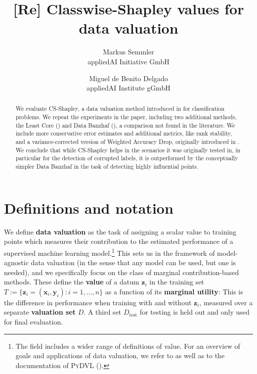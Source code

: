 \documentclass[10pt]{article}
\newcommand{\assign}{:=}
\newcommand{\tmaffiliation}[1]{\\ #1}
\newcommand{\tmdfn}[1]{\textbf{#1}}
\newcommand{\tmmathbf}[1]{\ensuremath{\boldsymbol{#1}}}
\newcommand{\tmname}[1]{\textsc{#1}}
\newcommand{\tmop}[1]{\ensuremath{\operatorname{#1}}}
\begin{document}
\title{[Re] Classwise-Shapley values for data valuation}

\author{
  Markus Semmler
  \tmaffiliation{appliedAI Initiative GmbH}
  \and
  Miguel de Benito Delgado
  \tmaffiliation{appliedAI Institute gGmbH}
}

\maketitle

\begin{abstract}
  We evaluate CS-Shapley, a data valuation method introduced in
  {\cite{schoch_csshapley_2022}} for classification problems. We repeat the
  experiments in the paper, including two additional methods, the Least Core
  ({\cite{yan_if_2021}}) and Data Banzhaf ({\cite{wang_data_2022}}), a
  comparison not found in the literature. We include more conservative error
  estimates and additional metrics, like rank stability, and a
  variance-corrected version of Weighted Accuracy Drop, originally introduced
  in {\cite{schoch_csshapley_2022}}. We conclude that while CS-Shapley helps
  in the scenarios it was originally tested in, in particular for the
  detection of corrupted labels, it is outperformed by the conceptually
  simpler Data Banzhaf in the task of detecting highly influential points.
\end{abstract}

\section{Definitions and notation}

We define {\tmdfn{data valuation}} as the task of assigning a scalar value to
training points which measures their contribution to the estimated performance
of a supervised machine learning model.\footnote{The field includes a wider
range of definitions of value. For an overview of goals and applications of
data valuation, we refer to {\cite{sim_data_2022}} as well as to the
documentation of {\tmname{PyDVL}} ({\cite{transferlab_pydvl_2022}}).} This
sets us in the framework of model-agnostic data valuation (in the sense that
any model can be used, but one is needed), and we specifically focus on the
class of marginal contribution-based methods. These define the {\tmdfn{value}}
of a datum $\tmmathbf{z}_i$ in the training set $T \assign \{ \tmmathbf{z}_i =
(\tmmathbf{x}_i, \tmmathbf{y}_i) : i = 1, \ldots, n \}$ as a function of its
{\tmdfn{marginal utility}}: This is the difference in performance when
training with and without $\tmmathbf{z}_i$, measured over a separate
{\tmdfn{valuation set}} $D$. A third set $D_{\tmop{test}}$ for testing is held
out and only used for final evaluation.
\end{document}
